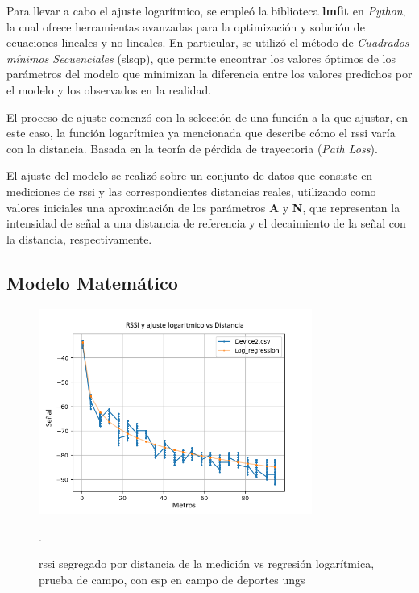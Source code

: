 Para llevar a cabo el ajuste logarítmico, se empleó la biblioteca \textbf{lmfit} en \textit{Python}, la cual ofrece herramientas avanzadas para la optimización y solución de ecuaciones lineales y no lineales. En particular, se utilizó el método de \textit{Cuadrados mínimos Secuenciales} (\acs{slsqp}), que permite encontrar los valores óptimos de los parámetros del modelo que minimizan la diferencia entre los valores predichos por el modelo y los observados en la realidad.

El proceso de ajuste comenzó con la selección de una función a la que ajustar, en este caso, la función logarítmica ya mencionada que describe cómo el \acs{rssi} varía con la distancia. Basada en la teoría de pérdida de trayectoria (\textit{Path Loss}).

El ajuste del modelo se realizó sobre un conjunto de datos que consiste en mediciones de \acs{rssi} y las correspondientes distancias reales, utilizando como valores iniciales una aproximación de los parámetros \textbf{A} y \textbf{N}, que representan la intensidad de señal a una distancia de referencia y el decaimiento de la señal con la distancia, respectivamente.

\subsection{Modelo Matemático}
\begin{figure}[!htb]
	\centering
\includegraphics[width=0.8\textwidth]{Figuras/profiling/device2/device2-profiling.png}
	\captionsetup{margin=2cm}
	\caption[\acs{rssi} segregado por distancia de la medición vs regresión logarítmica, prueba de campo]{\acs{rssi} segregado por distancia de la medición vs regresión logarítmica, prueba de campo, con \acs{esp} en campo de deportes \acs{ungs}}.
	\label{fig:log-fit}
\end{figure}

